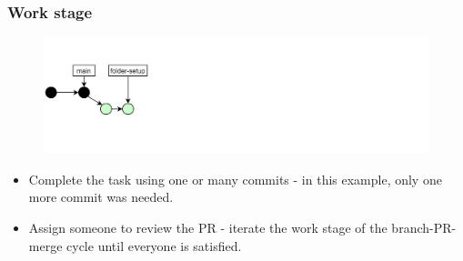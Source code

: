 \documentclass[aspectratio=169]{beamer}
\begin{document}
\begin{frame}
	\frametitle{Work stage}

	\vspace{-.5cm}
	\begin{minipage}[t][5cm][t]{\textwidth}
		\begin{figure}
			\centering
			\includegraphics[width=\textwidth]{./img/dime-gitflow-network-1-2.png}
		\end{figure}
	\end{minipage}

	\vspace{-.5cm}
	\begin{minipage}[t][5cm][t]{\textwidth}
		\begin{itemize}
			\setlength\itemsep{.5em}
			\item Complete the task using one or many commits
			- in this example, only one more commit was needed.
			\item Assign someone to review the PR
			- iterate the work stage of the branch-PR-merge cycle until everyone is satisfied.
		\end{itemize}
	\end{minipage}

\end{frame}
\end{document}
